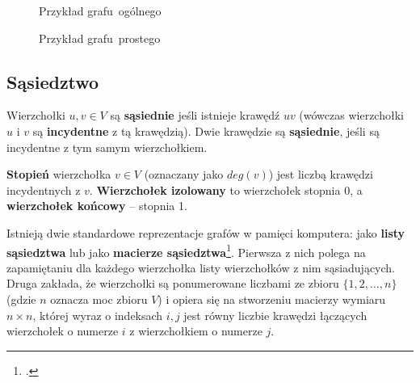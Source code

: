 \begin{figure}[h]
\centering
\begin{minipage}{.45\textwidth}
  \centering
\captionsetup{justification=centering}
\caption{Przykład grafu~ogólnego} \label{fig:simple-graph}
\end{minipage}
\begin{minipage}{.45\textwidth}
  \centering
\captionsetup{justification=centering}
\caption{Przykład grafu~prostego} \label{fig:graph}
\end{minipage}
\end{figure}

\subsection*{Sąsiedztwo}

Wierzchołki $u,v \in V$ są \textbf{sąsiednie} jeśli istnieje krawędź $uv$ (wówczas wierzchołki $u$ i $v$ są \textbf{incydentne} z tą krawędzią). Dwie krawędzie są \textbf{sąsiednie}, jeśli są incydentne z tym samym wierzchołkiem. 

\textbf{Stopień} wierzchołka $v \in V$ (oznaczany jako $deg(v)$) jest liczbą krawędzi incydentnych z $v$. \textbf{Wierzchołek izolowany} to wierzchołek stopnia 0, a \textbf{wierzchołek końcowy} -- stopnia 1.

Istnieją dwie standardowe reprezentacje grafów w pamięci komputera: jako \textbf{listy sąsiedztwa} lub jako \textbf{macierze sąsiedztwa}\footcites[29]{banachowski}[600]{cormen}. Pierwsza z nich polega na zapamiętaniu dla każdego wierzchołka listy wierzchołków z nim sąsiadujących. Druga zakłada, że wierzchołki są ponumerowane liczbami ze zbioru $\{1, 2,\ldots,n\}$ (gdzie $n$ oznacza moc zbioru $V$) i opiera się na stworzeniu macierzy wymiaru $n \times n$, której wyraz o indeksach $i,j$ jest równy liczbie krawędzi łączących wierzchołek o numerze $i$ z wierzchołkiem o numerze $j$.

